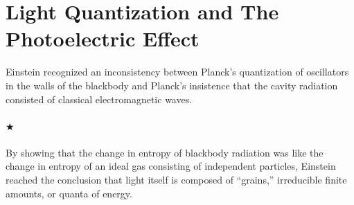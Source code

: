 \section{Light Quantization and The Photoelectric Effect}
    Einstein recognized an inconsistency between Planck’s quantization of oscillators in the walls 
    of the blackbody and Planck’s insistence that the cavity radiation consisted of classical electromagnetic waves.

    \paragraph{\color{c3}$\bigstar$} By showing that the change in entropy of blackbody radiation was like 
    the change in entropy of an ideal gas consisting of independent particles, Einstein reached the conclusion 
    that light itself is composed of “grains,” irreducible finite amounts, or quanta of energy.

